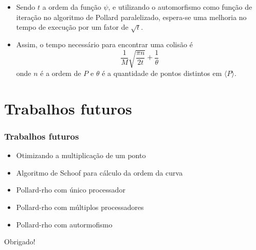 \documentclass{beamer}
\begin{document}
\begin{frame}
  \begin{itemize}
    \item Sendo $t$ a ordem da função $\psi$, e utilizando o automorfismo como função de iteração no algoritmo de Pollard paralelizado, espera-se uma melhoria no tempo de execução por um fator de $\sqrt{t}$.
    \item Assim, o tempo necessário para encontrar uma colisão é
    $$
      \frac{1}{M}\sqrt{\frac{\pi n}{2t}} + \frac{1}{\theta}
    $$
    onde $n$ é a ordem de $P$ e $\theta$ é a quantidade de pontos distintos em $\langle P \rangle$.
  \end{itemize}
\end{frame}

%
%

\section{Trabalhos futuros}
\begin{frame}
\frametitle{Trabalhos futuros}
  \begin{itemize}
    \item Otimizando a multiplicação de um ponto
    \item Algoritmo de Schoof para cálculo da ordem da curva
    \item Pollard-rho com único processador
    \item Pollard-rho com múltiplos processadores
    \item Pollard-rho com autormofismo
  \end{itemize}
\end{frame}

\begin{frame}
\begin{center}
  Obrigado!
\end{center}
\end{frame}
\end{document}

